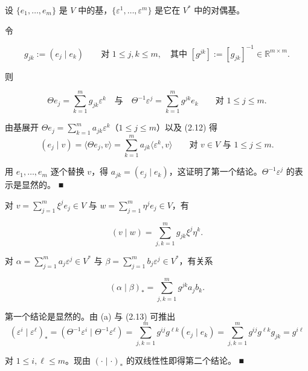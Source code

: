 \begin{remark}

设 $ \{e_{1},\ldots,e_{m}\} $ 是 $ V $ 中的基，$ \{\varepsilon^{1},\ldots,\varepsilon^{m}\} $ 是它在 $ V^{*} $ 中的对偶基。

\begin{items}
\item

令

\[
g_{jk} := (e_{j}\mid e_{k}) \qquad \text{对 } 1 \le j,k \le m , \quad \text{其中 } [g^{jk}] := [g_{jk}]^{-1} \in \mathbb{R}^{m\times m} .
\]

则

\[
\Theta e_{j} = \sum_{k=1}^{m} g_{jk}\varepsilon^{k} \quad \text{与} \quad \Theta^{-1}\varepsilon^{j} = \sum_{k=1}^{m} g^{jk}e_{k} \qquad \text{对 } 1 \le j \le m .
\]

\proofhead
由基展开 $ \Theta e_{j} = \sum_{k=1}^{m} a_{jk}\varepsilon^{k} $（$ 1 \le j \le m $）以及 (2.12) 得
\[
(e_{j}\mid v) = \langle \Theta e_{j}, v\rangle = \sum_{k=1}^{m} a_{jk}\langle \varepsilon^{k}, v\rangle \qquad \text{对 } v \in V \text{ 与 } 1 \le j \le m .
\]

用 $ e_{1},\ldots,e_{m} $ 逐个替换 $ v $，得 $ a_{jk} = (e_{j}\mid e_{k}) $，这证明了第一个结论。$ \Theta^{-1}\varepsilon^{j} $ 的表示是显然的。 \nobreak\hspace{0.35em}■

\item

对 $ v = \sum_{j=1}^{m}\xi^{j}e_{j} \in V $ 与 $ w = \sum_{j=1}^{m}\eta^{j}e_{j} \in V $，有

\[
(v\mid w) = \sum_{j,k=1}^{m} g_{jk}\xi^{j}\eta^{k} .
\]

对 $ \alpha = \sum_{j=1}^{m}a_{j}\varepsilon^{j} \in V^{*} $ 与 $ \beta = \sum_{j=1}^{m}b_{j}\varepsilon^{j} \in V^{*} $，有关系

\[
(\alpha\mid\beta)_{*} = \sum_{j,k=1}^{m} g^{jk}a_{j}b_{k} .
\]

\proofhead
第一个结论是显然的。由 (a) 与 (2.13) 可推出
\[
(\varepsilon^{i}\mid\varepsilon^{\ell})_{*} = (\Theta^{-1}\varepsilon^{i}\mid\Theta^{-1}\varepsilon^{\ell}) = \sum_{j,k=1}^{m} g^{ij}g^{\ell k}(e_{j}\mid e_{k}) = \sum_{j,k=1}^{m} g^{ij}g^{\ell k}g_{jk} = g^{i\ell}
\]

对 $ 1 \le i,\ell \le m $。现由 $ (\cdot\mid\cdot)_{*} $ 的双线性性即得第二个结论。 \nobreak\hspace{0.35em}■

\item


\end{items}
\end{remark}
